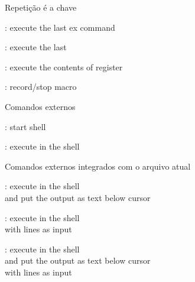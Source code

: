 \begin{frame}{Repetição é a chave}
    \begin{widedescription}
        \item {}: execute the last ex command
        \item {}: execute the last 
        \item {}: execute the contents of register
        \item {}: record/stop macro
    \end{widedescription}
\end{frame}

\begin{frame}{Comandos externos}
    \begin{widedescription}
        \item {}: start shell
        \item {}: execute  in the shell
    \end{widedescription}
\end{frame}

\begin{frame}{Comandos externos integrados com o arquivo atual}
    \begin{widedescription}
        \item {}: execute  in the shell \\ and put the output as text below cursor
        \item {}: execute  in the shell \\ with \key{[range]} lines as input
        \item {}: execute  in the shell \\ and put the output as text below cursor \\ with \key{[range]} lines as input
    \end{widedescription}
\end{frame}